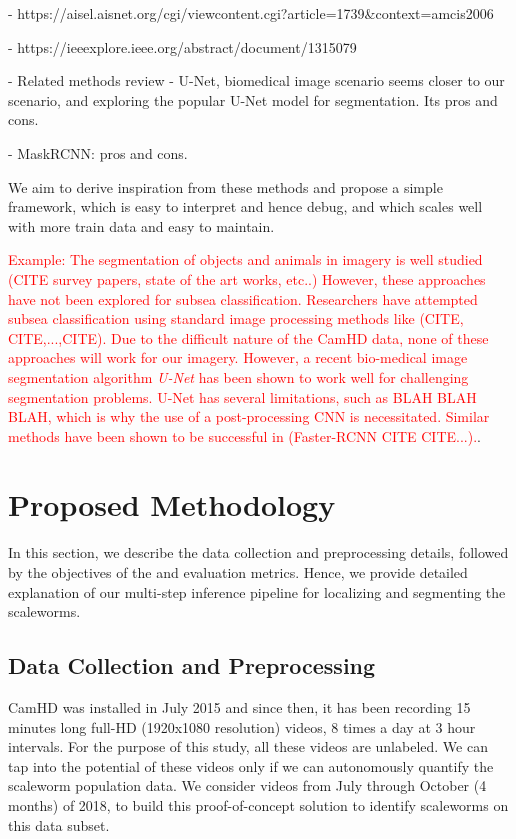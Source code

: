 \documentclass[10pt,twocolumn,letterpaper]{article}
\begin{document}
    - https://aisel.aisnet.org/cgi/viewcontent.cgi?article=1739&context=amcis2006
 
    - https://ieeexplore.ieee.org/abstract/document/1315079

- Related methods review
    - U-Net, biomedical image scenario seems closer to our scenario, and exploring the popular U-Net model for segmentation. Its pros and cons.

    - MaskRCNN: pros and cons.

    We aim to derive inspiration from these methods and propose a simple framework, which is easy to interpret and hence debug, and which scales well with more train data and easy to maintain.
    
\textcolor{red}{Example: The segmentation of objects and animals in imagery is well studied (CITE survey papers, state of the art works, etc..) However, these approaches have not been explored for subsea classification. Researchers have attempted subsea classification using standard image processing methods like (CITE, CITE,...,CITE). Due to the difficult nature of the CamHD data, none of these approaches will work for our imagery. However, a recent bio-medical image segmentation algorithm \textit{U-Net} has been shown to work well for challenging segmentation problems. U-Net has several limitations, such as BLAH BLAH BLAH, which is why the use of a post-processing CNN is necessitated. Similar methods have been shown to be successful in (Faster-RCNN CITE CITE...).}.

\section{Proposed Methodology}

In this section, we describe the data collection and preprocessing details, followed by the objectives of the and evaluation metrics. Hence, we provide detailed explanation of our multi-step inference pipeline for localizing and segmenting the scaleworms.

\subsection{Data Collection and Preprocessing} \label{section:data}
CamHD was installed in July 2015 and since then, it has been recording 15 minutes long full-HD (1920x1080 resolution) videos, 8 times a day at 3 hour intervals. For the purpose of this study, all these videos are unlabeled. We can tap into the potential of these videos only if we can autonomously quantify the scaleworm population data. We consider videos from July through October (4 months) of 2018, to build this proof-of-concept solution to identify scaleworms on this data subset.
\end{document}

